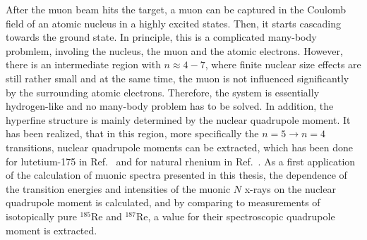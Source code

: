 After the muon beam hits the target, a muon can be captured in the Coulomb field of an atomic nucleus in a highly excited states. Then, it starts cascading towards the ground state. In principle, this is a complicated many-body probmlem, involing the nucleus, the muon and the atomic electrons. However, there is an intermediate region with $n\approx 4 - 7$, where finite nuclear size effects are still rather small and at the same time, the muon is not influenced significantly by the surrounding atomic electrons. Therefore, the system is essentially hydrogen-like and no many-body problem has to be solved. In addition, the hyperfine structure is mainly determined by the nuclear quadrupole moment. It has been realized, that in this region, more specifically the ${n}{=}{5}\rightarrow{n}{=}{4}$ transitions, nuclear quadrupole moments can be extracted, which has been done for lutetium-175 in Ref.~\cite{Dey1979} and for natural rhenium in Ref.~\cite{konijn1979}.
As a first application of the calculation of muonic spectra presented in this thesis, the dependence of the transition energies and intensities of the muonic $N$ x-rays on the nuclear quadrupole moment is calculated, and by comparing to measurements of isotopically pure $^{185}$Re and $^{187}$Re, a value for their spectroscopic quadrupole moment is extracted.

